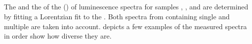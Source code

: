 	\FloatBarrier	

\subsection{\Zpl}\label{subsec::zpl}

	The \cwl and the \lw of the \zpl (\ZPL) of \siv luminescence spectra for samples \insituF, \insituS, and \insituH are determined by fitting a Lorentzian fit to the \ZPL.
	Both spectra from \nds containing single and multiple \sivs are taken into account.
	 depicts a few examples of the measured spectra in order show how diverse they are.

	\begin{figure}[!htb]
		\begin{subfigure}[t]{ 0.49\linewidth}
			\centering
			\caption{}
			\label{subfig::spectrum_1}
		\end{subfigure}
		\hfill
		\begin{subfigure}[t]{ 0.49\linewidth}
			\centering

\end{subfigure}
\end{figure}
